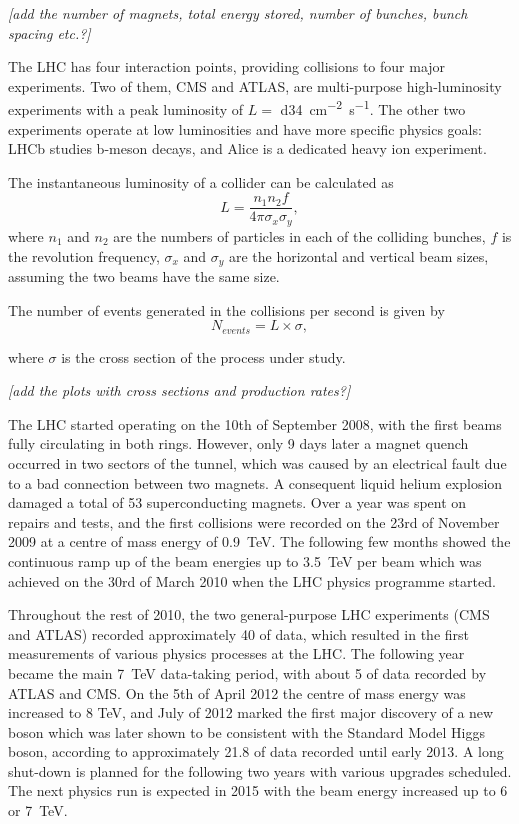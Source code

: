 \textit{[add the number of magnets, total energy stored, number of bunches, bunch spacing etc.?]}

The LHC has four interaction points, providing collisions to four major experiments. Two of them, CMS and ATLAS, are
multi-purpose high-luminosity experiments with a peak luminosity of $L = $ \SI{d34}{\cm^{-2} s^{-1}}. The other two
experiments operate at low luminosities and have more specific physics goals: LHCb studies b-meson decays, and Alice is
a dedicated heavy ion experiment.

The instantaneous luminosity of a collider can be calculated as
\begin{equation}
	L = \frac{n_1 n_2 f}{4 \pi \sigma_x \sigma_y},
\end{equation}
where $n_1$ and $n_2$ are the numbers of particles in each of the colliding bunches, $f$ is the revolution frequency,
$\sigma_x$ and $\sigma_y$ are the horizontal and vertical beam sizes, assuming the two beams have the same size.

The number of events generated in the collisions per second is given by
\begin{equation}
	N_{events} = L \times \sigma,
\end{equation}

where $\sigma$ is the cross section of the process under study.

\textit{[add the plots with cross sections and production rates?]}

The LHC started operating on the 10th of September 2008, with the first beams fully circulating in both rings. However,
only 9 days later a magnet quench occurred in two sectors of the tunnel, which was caused by an electrical fault due to
a bad connection between two magnets. A consequent liquid helium explosion damaged a total of 53 superconducting
magnets. Over a year was spent on repairs and tests, and the first collisions were recorded on the 23rd of November 2009
at a centre of mass energy of \SI{0.9}{\TeV}. The following few months showed the continuous ramp up of the beam
energies up to \SI{3.5}{\TeV} per beam which was achieved on the 30rd of March 2010 when the LHC physics programme
started.

Throughout the rest of 2010, the two general-purpose LHC experiments (CMS and ATLAS) recorded approximately
\SI{40}{\invpb} of data, which resulted in the first measurements of various physics processes at the LHC. The following
year became the main \SI{7}{\TeV} data-taking period, with about \SI{5}{\invfb} of data recorded by ATLAS and CMS. On
the 5th of April 2012 the centre of mass energy was increased to 8 TeV, and July of 2012 marked the first major
discovery of a new boson which was later shown to be consistent with the Standard Model Higgs boson, according to
approximately \SI{21.8}{\invfb} of data recorded until early 2013. A long shut-down is planned for the following two
years with various upgrades scheduled. The next physics run is expected in 2015 with the beam energy increased up to 6
or \SI{7}{\TeV}.

